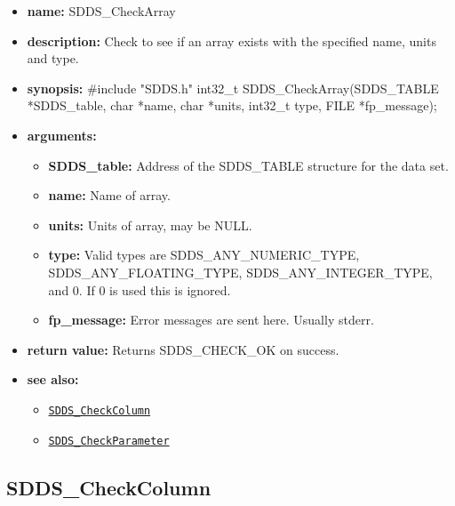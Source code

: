 \documentclass[11pt]{article}
\newcommand{\progref}[1]{\hyperref[SDDS_#1]{\tt SDDS\_#1}}
\begin{document}
\begin{itemize}
\item {\bf name:}\newline
SDDS\_CheckArray
\item {\bf description:}\newline
Check to see if an array exists with the specified name, units and type.
\item {\bf synopsis:} \#include "SDDS.h"\newline
int32\_t SDDS\_CheckArray(SDDS\_TABLE *SDDS\_table, char *name, char *units, int32\_t type, FILE *fp\_message);
\item {\bf arguments:}
\begin{itemize}
\item {\bf SDDS\_table:} Address of the SDDS\_TABLE structure for the data set.
\item {\bf name:} Name of array.
\item {\bf units:} Units of array, may be NULL.
\item {\bf type:} Valid types are SDDS\_ANY\_NUMERIC\_TYPE, SDDS\_ANY\_FLOATING\_TYPE, SDDS\_ANY\_INTEGER\_TYPE, and 0. If 0 is used this is ignored.
\item {\bf fp\_message:} Error messages are sent here. Usually stderr.
\end{itemize}
\item {\bf return value:}\newline
Returns SDDS\_CHECK\_OK on success.
\item {\bf see also:}
\begin{itemize}
\item \progref{CheckColumn}
\item \progref{CheckParameter}
\end{itemize}
\end{itemize}

\subsection{SDDS\_CheckColumn}
\label{SDDS_CheckColumn}
\end{document}
